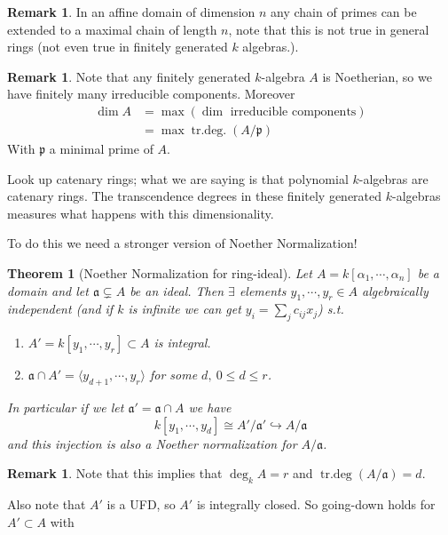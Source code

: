 \documentclass[11pt,a4paper]{article}
\theoremstyle{definition}
\newtheorem{remark}[definition]{Remark}
\theoremstyle{plain}
\newtheorem{theorem}[definition]{Theorem}
\theoremstyle{remark}
\newcommand{\angles}[1]{\langle #1 \rangle}
\begin{document}
\begin{remark}
    In an affine domain of dimension $n$ any chain of primes can be extended to a maximal chain of length $n$, note that 
    this is not true in general rings (not even true in finitely generated $k$ algebras.). 
\end{remark}

\begin{remark}
    Note that any finitely generated $k$-algebra $A$ is Noetherian, so we have finitely many irreducible 
    components. Moreover 
    \begin{align*}
        \dim A &= \max (\dim \text{ irreducible components}) \\
        &= \max \operatorname{tr.deg.} (A/\mathfrak{p})
    \end{align*}
    With $\mathfrak{p}$ a minimal prime of $A$. 

    Look up catenary rings; what we are saying is that polynomial $k$-algebras are catenary rings. The transcendence degrees 
    in these finitely generated $k$-algebras measures what happens with this dimensionality.  
\end{remark}

To do this we need a stronger version of  Noether Normalization! 
\begin{theorem}[Noether Normalization for ring-ideal]
    Let $A = k[\alpha_1, \cdots, \alpha_n]$ be a domain and let $\mathfrak{a} \subsetneq A$ be an ideal. 
    Then $\exists$ elements $y_1, \cdots, y_r \in A$ algebraically independent (and if $k$ is infinite we can get $y_i = \sum_j c_{ij} x_j$)
    s.t. 
    \begin{enumerate}
        \item $A' = k[y_1, \cdots, y_r] \subset A$ is integral. 
        \item $\mathfrak{a} \cap A' = \angles{y_{d + 1}, \cdots, y_r}$ for some $d, \ 0 \le d \le r$.
    \end{enumerate}
    In particular if we let $\mathfrak{a}' = \mathfrak{a} \cap A$ we have 
    $$k[y_1, \cdots, y_d] \cong A'/\mathfrak{a}' \hookrightarrow A/\mathfrak{a} $$
    and this injection is also a Noether normalization for $A/\mathfrak{a}$.
\end{theorem}

\begin{remark}
    Note that this implies that $\deg_k A = r$ and $\operatorname{tr.deg} (A/\mathfrak{a}) = d$. 

    Also note that $A'$ is a UFD, so $A'$ is integrally closed. So going-down holds for $A' \subset A$ with 
\end{remark}
\end{document}
